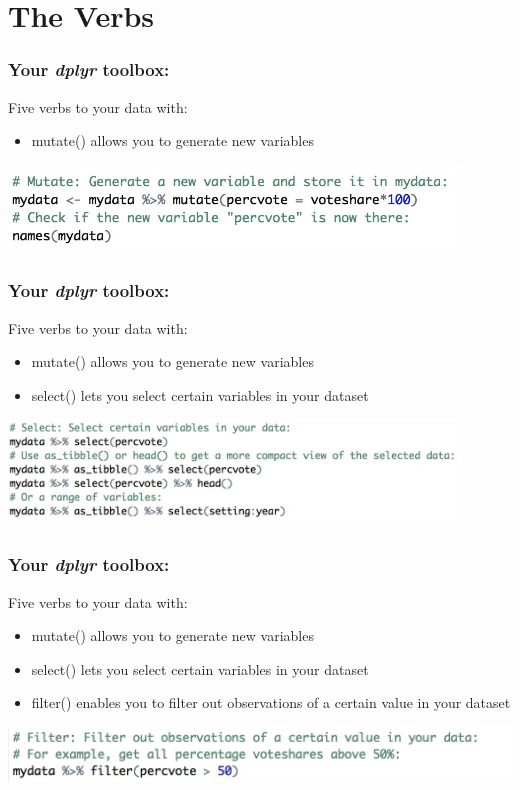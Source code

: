\documentclass{beamer}
\begin{document}
\section{The Verbs}
\begin{frame}
\frametitle{Your \textit{dplyr} toolbox:}
Five verbs to {\color{blue}{manipulate}} your data with:
\begin{itemize}
\item mutate() allows you to generate new variables
\end{itemize}
\begin{center}
{\color{blue}{Example:}}
\includegraphics[width=0.9\textwidth]{mutate.jpg}
\end{center}
\end{frame}

\begin{frame}
\frametitle{Your \textit{dplyr} toolbox:}
Five verbs to {\color{blue}{manipulate}} your data with:
\begin{itemize}
\item mutate() allows you to generate new variables
\item select() lets you select certain variables in your dataset
\end{itemize}
\begin{center}
{\color{blue}{Example:}}
\includegraphics[width=0.9\textwidth]{select.jpg}
\end{center}
\end{frame}

\begin{frame}
\frametitle{Your \textit{dplyr} toolbox:}
Five verbs to {\color{blue}{manipulate}} your data with:
\begin{itemize}
\item mutate() allows you to generate new variables
\item select() lets you select certain variables in your dataset
\item filter() enables you to filter out observations of a certain value in your dataset
\end{itemize}
\begin{center}
{\color{blue}{Example:}}
\includegraphics[width=1\textwidth]{filter.jpg}
\end{center}
\end{frame}
\end{document}
